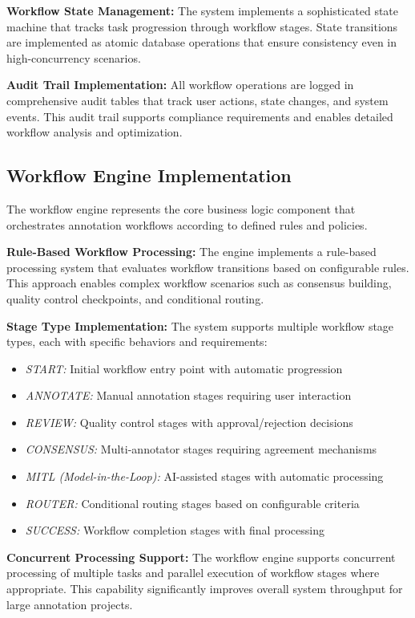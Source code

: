 \textbf{Workflow State Management:} The system implements a sophisticated state machine that tracks task progression through workflow stages. State transitions are implemented as atomic database operations that ensure consistency even in high-concurrency scenarios.

\textbf{Audit Trail Implementation:} All workflow operations are logged in comprehensive audit tables that track user actions, state changes, and system events. This audit trail supports compliance requirements and enables detailed workflow analysis and optimization.

\subsection{Workflow Engine Implementation}

The workflow engine represents the core business logic component that orchestrates annotation workflows according to defined rules and policies.

\textbf{Rule-Based Workflow Processing:} The engine implements a rule-based processing system that evaluates workflow transitions based on configurable rules. This approach enables complex workflow scenarios such as consensus building, quality control checkpoints, and conditional routing.

\textbf{Stage Type Implementation:} The system supports multiple workflow stage types, each with specific behaviors and requirements:

\begin{itemize}
    \item \textit{START:} Initial workflow entry point with automatic progression
    \item \textit{ANNOTATE:} Manual annotation stages requiring user interaction
    \item \textit{REVIEW:} Quality control stages with approval/rejection decisions
    \item \textit{CONSENSUS:} Multi-annotator stages requiring agreement mechanisms
    \item \textit{MITL (Model-in-the-Loop):} AI-assisted stages with automatic processing
    \item \textit{ROUTER:} Conditional routing stages based on configurable criteria
    \item \textit{SUCCESS:} Workflow completion stages with final processing
\end{itemize}

\textbf{Concurrent Processing Support:} The workflow engine supports concurrent processing of multiple tasks and parallel execution of workflow stages where appropriate. This capability significantly improves overall system throughput for large annotation projects.

